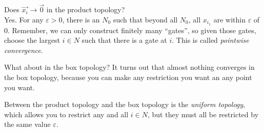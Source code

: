 \documentclass[12pt]{report}
\begin{document}
Does $\vec{x_i} \rightarrow \vec{0}$ in the product topology?  \\

Yes. For any $\varepsilon > 0$, there is an $N_0$ such that beyond all $N_0$, 
all $x_{i_1}$ are within $\varepsilon$ of 0. Remember, we can only construct
finitely many ``gates'', so given those gates, choose the largest $i \in N$
such that there is a gate at $i$.  This is called
 {\em pointwise convergence}.

What about in the box topology? It turns out that almost nothing converges in
the box topology, because you can make any restriction you want an any point
you want. 

Between the product topology and the box topology is the
 {\em uniform topology}, which allows you to restrict
any and all $i \in N$, but they must all be restricted by the same value
$\varepsilon$.





\printindex
\end{document}
